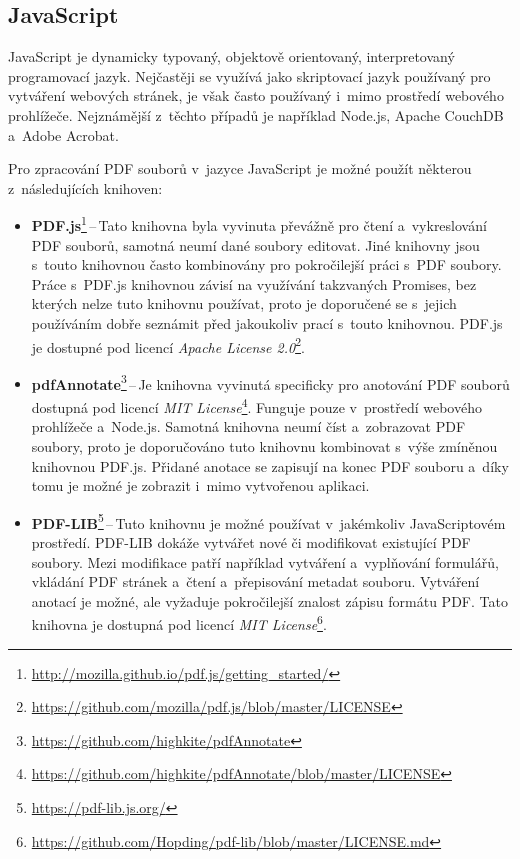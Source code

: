 \subsection*{JavaScript}

JavaScript je dynamicky typovaný, objektově orientovaný, interpretovaný
programovací jazyk. Nejčastěji se využívá jako skriptovací jazyk používaný
pro vytváření webových stránek, je však často používaný i~mimo prostředí webového
prohlížeče. Nejznámější z~těchto případů je například Node.js, Apache CouchDB
a~Adobe Acrobat. 
\cite{JavaScript}

Pro zpracování PDF souborů v~jazyce JavaScript je možné použít některou
z~následujících knihoven:
\begin{itemize}
    \item \textbf{PDF.js}\footnote{
    \href{http://mozilla.github.io/pdf.js/getting_started/}{http://mozilla.github.io/pdf.js/getting\_started/}
    }\,--\,Tato knihovna byla vyvinuta převážně pro čtení a~vykreslování PDF
    souborů, samotná neumí dané soubory editovat. Jiné knihovny jsou s~touto
    knihovnou často kombinovány pro pokročilejší práci s~PDF soubory. Práce
    s~PDF.js knihovnou závisí na využívání takzvaných Promises, bez kterých nelze
    tuto knihovnu používat, proto je doporučené se s~jejich používáním dobře
    seznámit před jakoukoliv prací s~touto knihovnou. PDF.js je dostupné pod
    licencí \emph{Apache License 2.0}\footnote{
    \href{https://github.com/mozilla/pdf.js/blob/master/LICENSE}{https://github.com/mozilla/pdf.js/blob/master/LICENSE}}.
    
    \item \textbf{pdfAnnotate}\footnote{
    \href{https://github.com/highkite/pdfAnnotate}{https://github.com/highkite/pdfAnnotate}
    }\,--\,Je knihovna vyvinutá specificky pro anotování PDF souborů dostupná pod
    licencí \emph{MIT License}\footnote{
    \href{https://github.com/highkite/pdfAnnotate/blob/master/LICENSE}{https://github.com/highkite/pdfAnnotate/blob/master/LICENSE}
    }. Funguje pouze v~prostředí webového prohlížeče a~Node.js. Samotná knihovna
    neumí číst a~zobrazovat PDF soubory, proto je doporučováno tuto knihovnu
    kombinovat s~výše zmíněnou knihovnou PDF.js. Přidané anotace se zapisují
    na konec PDF souboru a~díky tomu je možné je zobrazit i~mimo vytvořenou
    aplikaci.
    
    \item \textbf{PDF-LIB}\footnote{
    \href{https://pdf-lib.js.org/}{https://pdf-lib.js.org/}
    }\,--\,Tuto knihovnu je možné používat v~jakémkoliv JavaScriptovém prostředí.
    PDF-LIB dokáže vytvářet nové či modifikovat existující PDF soubory. Mezi
    modifikace patří například vytváření a~vyplňování formulářů, vkládání PDF
    stránek a~čtení a~přepisování metadat souboru. Vytváření anotací je možné, ale
    vyžaduje pokročilejší znalost zápisu formátu PDF. Tato knihovna je dostupná
    pod licencí \emph{MIT License}\footnote{
    \href{https://github.com/Hopding/pdf-lib/blob/master/LICENSE.md}{https://github.com/Hopding/pdf-lib/blob/master/LICENSE.md}
    }.
\end{itemize}


